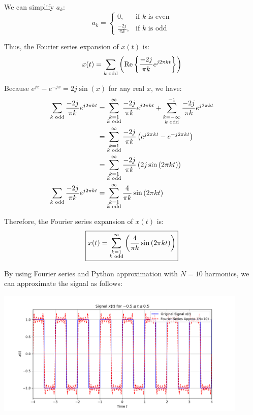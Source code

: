 \documentclass[a4paper, 10pt]{article}
\begin{document}
\begin{solution}
We can simplify \( a_k \):
\[
a_k =
\begin{cases}
0, & \text{if } k \text{ is even} \\
\frac{-2j}{\pi k}, & \text{if } k \text{ is odd}
\end{cases}
\]

Thus, the Fourier series expansion of \( x(t) \) is:
\[ x(t) = \sum_{k \text{ odd}} \left( \text{Re} \left\{ \frac{-2j}{\pi k} e^{j 2\pi k t} \right\} \right) \]

Because \( e^{jx} - e^{-jx} = 2j\sin{(x)} \) for any real \( x \), we have:
\begin{align*}
    \sum_{k \text{ odd}} \frac{-2j}{\pi k} e^{j 2\pi k t} &= \sum_{\substack{k=1 \\ k \text{ odd}}}^{\infty} \frac{-2j}{\pi k} e^{j 2\pi k t} + \sum_{\substack{k=-\infty \\ k \text{ odd}}}^{-1} \frac{-2j}{\pi k} e^{j 2\pi k t} \\
    &= \sum_{\substack{k=1 \\ k \text{ odd}}}^{\infty} \frac{-2j}{\pi k} \left( e^{j 2\pi k t} - e^{-j 2\pi k t} \right) \\
    &= \sum_{\substack{k=1 \\ k \text{ odd}}}^{\infty} \frac{-2j}{\pi k} \left( 2j\sin{(2\pi k t)} \right) \\
    \sum_{k \text{ odd}} \frac{-2j}{\pi k} e^{j 2\pi k t} &= \sum_{\substack{k=1 \\ k \text{ odd}}}^{\infty} \frac{4}{\pi k} \sin{(2\pi k t)}
\end{align*}

Therefore, the Fourier series expansion of \( x(t) \) is:
\[ \boxed{ x(t) = \sum_{\substack{k=1 \\ k \text{ odd}}}^{\infty} \left( \frac{4}{\pi k} \sin{(2\pi k t)} \right) } \]

\newpage

By using Fourier series and Python approximation with \( N = 10 \) harmonics, we can approximate the signal as follows:
\begin{center}
    \includegraphics[width=0.9\textwidth]{images/problem_1.png}
\end{center}
\end{solution}
\end{document}

